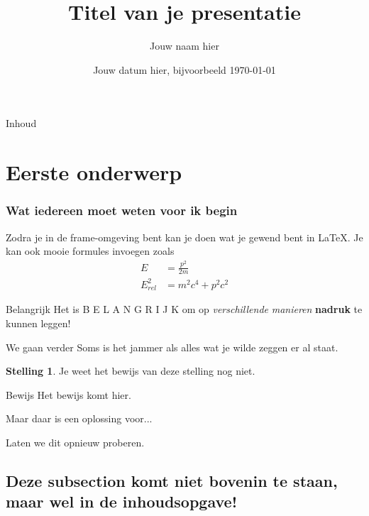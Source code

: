 \documentclass{beamer}
\title{Titel van je presentatie}
\date{Jouw datum hier, bijvoorbeeld \today}
\author{Jouw naam hier}
\theoremstyle{definition}
\theoremstyle{example}
\newtheorem{thm}[dfn]{Stelling}%
\begin{document}
\begin{frame}
\titlepage
\end{frame}	

\begin{frame}{Inhoud}%
	\tableofcontents
\end{frame}

\section{Eerste onderwerp}


\begin{frame}
	\frametitle{Wat iedereen moet weten voor ik begin}
	Zodra je in de frame-omgeving bent kan je doen wat je gewend bent in \LaTeX. Je kan ook mooie formules invoegen zoals
	\begin{align}
	E &= \frac{p^2}{2m}\\
	E_{rel}^2 &= m^2c^4 + p^2c^2
	\end{align}
	\begin{block}{Belangrijk}
		Het is   B E L A N G R I J K   om op \textit{verschillende} \emph{manieren} \textbf{nadruk} te kunnen leggen!
	\end{block}
 
\end{frame}

\begin{frame}{We gaan verder}
Soms is het jammer als alles wat je wilde zeggen er al staat.\newline
\begin{thm}
	Je weet het bewijs van deze stelling nog niet.
\end{thm}
\begin{block}{Bewijs}
	Het bewijs komt hier.
\end{block}
Maar daar is een oplossing voor...

Laten we dit opnieuw proberen.

\end{frame}

\subsection{Deze subsection komt niet bovenin te staan, maar wel in de inhoudsopgave!}
\end{document}
